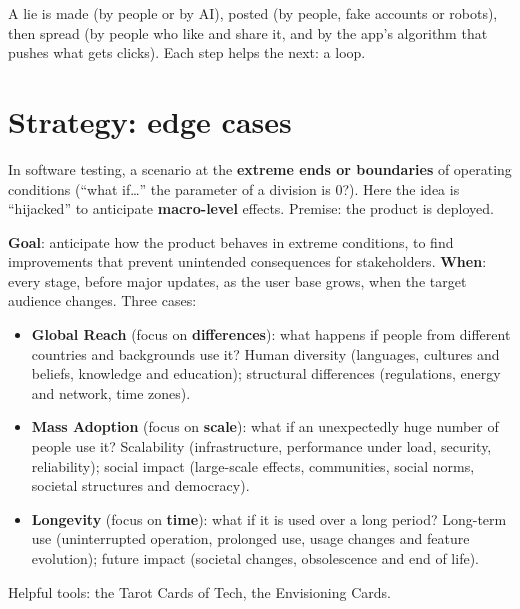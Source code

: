 \documentclass[11pt,a4paper,openany]{book}
\begin{document}
\begin{goatbox}
A lie is made (by people or by AI), posted (by people, fake accounts or robots), then spread (by
people who like and share it, and by the app's algorithm that pushes what gets clicks). Each step
helps the next: a loop.
\end{goatbox}


\section{Strategy: edge cases}

\begin{defnbox}[title={Edge case}]
In software testing, a scenario at the \textbf{extreme ends or boundaries} of operating
conditions (``what if\ldots'' the parameter of a division is 0?). Here the idea is
``hijacked'' to anticipate \textbf{macro-level} effects. Premise: the product is deployed.
\end{defnbox}

\begin{algbox}[title={Applying the strategy (cheat sheet 2.6)}]
\textbf{Goal}: anticipate how the product behaves in extreme conditions, to find improvements
that prevent unintended consequences for stakeholders. \textbf{When}: every stage, before major
updates, as the user base grows, when the target audience changes. Three cases:
\begin{itemize}
  \item \textbf{Global Reach} (focus on \textbf{differences}): what happens if people from
        different countries and backgrounds use it? Human diversity (languages, cultures and
        beliefs, knowledge and education); structural differences (regulations, energy and
        network, time zones).
  \item \textbf{Mass Adoption} (focus on \textbf{scale}): what if an unexpectedly huge number of
        people use it? Scalability (infrastructure, performance under load, security,
        reliability); social impact (large-scale effects, communities, social norms, societal
        structures and democracy).
  \item \textbf{Longevity} (focus on \textbf{time}): what if it is used over a long period?
        Long-term use (uninterrupted operation, prolonged use, usage changes and feature
        evolution); future impact (societal changes, obsolescence and end of life).
\end{itemize}
Helpful tools: the Tarot Cards of Tech, the Envisioning Cards.
\end{algbox}
\end{document}

